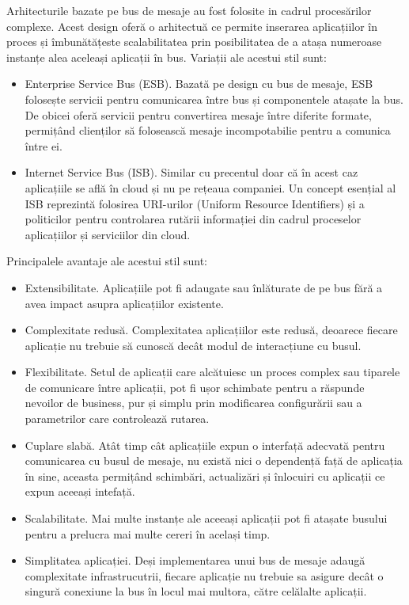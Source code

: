 \documentclass[12pt, a4paper, oneside, romanian]{teza-upb}
\begin{document}
Arhitecturile bazate pe bus de mesaje au fost folosite in cadrul procesărilor complexe. Acest design oferă o arhitectuă ce permite inserarea aplicațiilor în proces și îmbunătățeste scalabilitatea prin posibilitatea de a atașa numeroase instanțe alea aceleași aplicații în bus. Variații ale acestui stil sunt: 
\begin{itemize}
 \item Enterprise Service Bus (ESB). Bazată pe design cu bus de mesaje, ESB folosește servicii pentru comunicarea între bus și componentele atașate la bus. De obicei oferă servicii pentru convertirea mesaje între diferite formate, permițând clienților să folosească mesaje incompotabilie pentru a comunica între ei.
 \item Internet Service Bus (ISB). Similar cu precentul doar că în acest caz aplicațiile se află în cloud și nu pe rețeaua companiei. Un concept esențial al ISB reprezintă folosirea URI-urilor (Uniform Resource Identifiers) și a politicilor pentru controlarea rutării informației din cadrul proceselor aplicațiilor și serviciilor din cloud.
\end{itemize}

Principalele avantaje ale acestui stil sunt:
\begin{itemize}
 \item Extensibilitate. Aplicațiile pot fi adaugate sau înlăturate de pe bus fără a avea impact asupra aplicațiilor existente.
 \item Complexitate redusă. Complexitatea aplicațiilor este redusă, deoarece fiecare aplicație nu trebuie să cunoscă decât modul de interacțiune cu busul.
 \item Flexibilitate. Setul de aplicații care alcătuiesc un proces complex sau tiparele de comunicare între aplicații, pot fi ușor schimbate pentru a răspunde nevoilor de business, pur și simplu prin modificarea configurării sau a parametrilor care controlează rutarea.
 \item Cuplare slabă. Atât timp cât aplicațiile expun o interfață adecvată pentru comunicarea cu busul de mesaje, nu există nici o dependență față de aplicația în sine, aceasta permițând schimbări, actualizări și înlocuiri cu aplicații ce expun aceeași intefață.
 \item Scalabilitate. Mai multe instanțe ale aceeași aplicații pot fi atașate busului pentru a prelucra mai multe cereri în același timp.
 \item Simplitatea aplicației. Deși implementarea unui bus de mesaje adaugă complexitate infrastrucutrii, fiecare aplicație nu trebuie sa asigure decât o singură conexiune la bus în locul mai multora, către celălalte aplicații.
\end{itemize}
\end{document}

